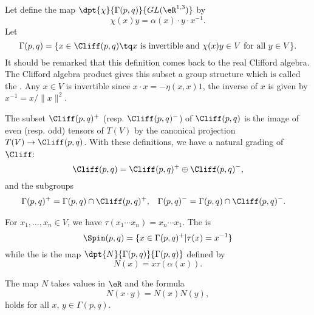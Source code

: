 Let define the map $\dpt{\chi}{\Gamma(p,q)}{GL(\eR^{1,3})}$ by
\begin{equation}
	\chi(x)y=\alpha(x)\cdot y\cdot x^{-1}.
\end{equation}
Let
\[
	\Gamma(p,q)=\{x\in\Cliff(p,q)\tq\textrm{$x$ is invertible and }  \chi(x)y  \in V\textrm{ for all $y\in V$}\}.
\]
It should be remarked that this definition comes back to the real Clifford algebra. The Clifford algebra product gives this subset a group structure which is called the . Any $x\in V$ is invertible since $x\cdot x=-\eta(x,x)1$, the inverse of $x$ is given by $x^{-1}=x/\|x\|^2$.

The subset $\Cliff(p,q)^+$ (resp. $\Cliff(p,q)^-$) of $\Cliff(p,q)$ is the image of even (resp. odd) tensors of $T(V)$ by the canonical projection $T(V)\to\Cliff(p,q)$. With these definitions, we have a natural grading of $\Cliff$:
\begin{equation}
	\label{directC}\Cliff(p,q)=\Cliff(p,q)^+\oplus\Cliff(p,q)^-,
\end{equation}
and the subgroups
\begin{align}
	\label{defgplus}
	\Gamma(p,q)^+ & =\Gamma(p,q)\cap\Cliff(p,q)^+, & \Gamma(p,q)^- & =\Gamma(p,q)\cap\Cliff(p,q)^-.
\end{align}

For $x_1,\ldots,x_n\in V$, we have $\tau(x_1\cdots x_n)=x_n\cdots x_1$.  The  is
\begin{equation}   \label{defSpinun}
	\Spin(p,q)=\{x\in\Gamma(p,q)^+\vert\tau(x)=x^{-1}\}
\end{equation}
while the  is the map $\dpt{N}{\Gamma(p,q)}{\Gamma(p,q)}$ defined by
\[
	N(x)=x\tau(\alpha(x)).
\]

\begin{proposition} \label{proppourN}
	The map $N$ takes values in $\eR$ and the formula
	\begin{equation}
		N(x\cdot y)=N(x)N(y),
	\end{equation}
	holds for all $x$, $y\in\Gamma(p,q)$.
\end{proposition}

